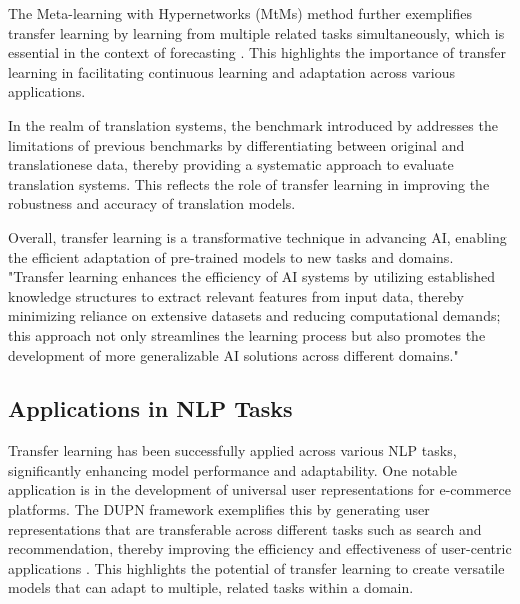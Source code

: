 The Meta-learning with Hypernetworks (MtMs) method further exemplifies transfer learning by learning from multiple related tasks simultaneously, which is essential in the context of forecasting \cite{stank2024designingtimeseriesmodelshypernetworks}. This highlights the importance of transfer learning in facilitating continuous learning and adaptation across various applications.



In the realm of translation systems, the benchmark introduced by \cite{bogoychev2020domaintranslationesenoisesynthetic} addresses the limitations of previous benchmarks by differentiating between original and translationese data, thereby providing a systematic approach to evaluate translation systems. This reflects the role of transfer learning in improving the robustness and accuracy of translation models.



Overall, transfer learning is a transformative technique in advancing AI, enabling the efficient adaptation of pre-trained models to new tasks and domains. "Transfer learning enhances the efficiency of AI systems by utilizing established knowledge structures to extract relevant features from input data, thereby minimizing reliance on extensive datasets and reducing computational demands; this approach not only streamlines the learning process but also promotes the development of more generalizable AI solutions across different domains." \cite{pihlgren2024systematicperformanceanalysisdeep,yuan2022secretgenprivacyrecoverypretrained}




\subsection{Applications in NLP Tasks} \label{subsec:Applications in NLP Tasks}

Transfer learning has been successfully applied across various NLP tasks, significantly enhancing model performance and adaptability. One notable application is in the development of universal user representations for e-commerce platforms. The DUPN framework exemplifies this by generating user representations that are transferable across different tasks such as search and recommendation, thereby improving the efficiency and effectiveness of user-centric applications \cite{ni2018perceiveusersdepthlearning}. This highlights the potential of transfer learning to create versatile models that can adapt to multiple, related tasks within a domain.

